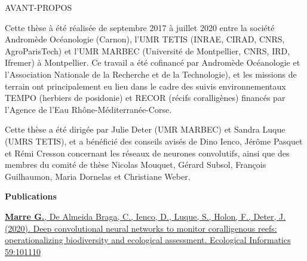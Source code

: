 {}
{\centerline { {\sffamily \Large AVANT-PROPOS}}}

\vspace*{1cm}
\vskip 0.5cm
\noindent

\normalsize
\noindent Cette thèse à été réalisée de septembre 2017 à juillet 2020 entre la société Andromède Océanologie (Carnon), l'UMR TETIS (INRAE, CIRAD, CNRS, AgroParisTech) et l'UMR MARBEC (Université de Montpellier, CNRS, IRD, Ifremer) à Montpellier. Ce travail a été cofinancé par Andromède Océanologie et l'Association Nationale de la Recherche et de la Technologie), et les missions de terrain ont principalement eu lieu dans le cadre des suivis environnementaux TEMPO (herbiers de posidonie) et RECOR (récifs coralligènes) financés par l'Agence de l'Eau Rhône-Méditerranée-Corse.

\medskip

\noindent Cette thèse a été dirigée par Julie Deter (UMR MARBEC) et Sandra Luque (UMRS TETIS), et a bénéficié des conseils avisés de Dino Ienco, Jérôme Pasquet et Rémi Cresson concernant les réseaux de neurones convolutifs, ainsi que des membres du comité de thèse Nicolas Mouquet, Gérard Subsol, François Guilhaumon, Maria Dornelas et Christiane Weber. 

\bigskip
\bigskip

\centerline{\textbf{\Large Publications}}

\medskip

\noindent\href{https://doi.org/10.1016/j.ecoinf.2020.101110}{\textbf{Marre G.}, De Almeida Braga, C., Ienco, D., Luque, S., Holon, F., Deter, J. (2020). Deep convolutional neural networks to monitor coralligenous reefs: operationalizing biodiversity and ecological assessment. Ecological Informatics 59:101110}

\medskip


\medskip


